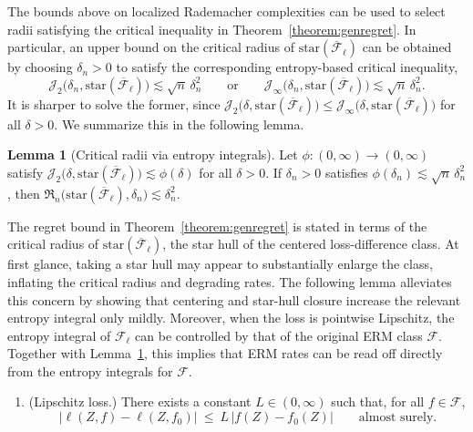 \documentclass[11pt]{article}
\theoremstyle{plain}
\theoremstyle{definition} %
\newtheorem{lemma}{Lemma}
\begin{document}
The bounds above on localized Rademacher complexities can be used to select radii satisfying the critical inequality in Theorem~\ref{theorem:genregret}. In particular, an upper bound on the critical radius of \(\mathrm{star}(\overline{\mathcal{F}}_{\ell})\) can be obtained by choosing \(\delta_n>0\) to satisfy the corresponding entropy-based critical inequality,
\[
\mathcal{J}_2\bigl(\delta_n,\mathrm{star}(\overline{\mathcal{F}}_{\ell})\bigr) \lesssim \sqrt{n}\,\delta_n^2
\qquad\text{or}\qquad
\mathcal{J}_\infty\bigl(\delta_n,\mathrm{star}(\overline{\mathcal{F}}_{\ell})\bigr) \lesssim \sqrt{n}\,\delta_n^2.
\]
It is sharper to solve the former, since \(\mathcal{J}_2\bigl(\delta,\mathrm{star}(\overline{\mathcal{F}}_{\ell})\bigr)\le \mathcal{J}_\infty\bigl(\delta,\mathrm{star}(\overline{\mathcal{F}}_{\ell})\bigr)\) for all \(\delta>0\). We summarize this in the following lemma.


\begin{lemma}[Critical radii via entropy integrals]
\label{lemma::critentropy}
Let \(\phi:(0,\infty)\to(0,\infty)\) satisfy
\(\mathcal{J}_2\bigl(\delta,\mathrm{star}(\overline{\mathcal{F}}_{\ell})\bigr)\lesssim \phi(\delta)\) for all \(\delta>0\).
If \(\delta_n>0\) satisfies \(\phi(\delta_n)\lesssim \sqrt{n}\,\delta_n^2\), then
\(\mathfrak{R}_n\bigl(\mathrm{star}(\overline{\mathcal{F}}_{\ell}),\delta_n\bigr)\lesssim \delta_n^2\).
\end{lemma}
 


The regret bound in Theorem~\ref{theorem:genregret} is stated in terms of the critical radius of
\(\mathrm{star}(\overline{\mathcal{F}}_{\ell})\), the star hull of the centered loss-difference class.
At first glance, taking a star hull may appear to substantially enlarge the class, inflating the critical radius and degrading rates.
The following lemma alleviates this concern by showing that centering and star-hull closure increase the relevant entropy integral only mildly.
Moreover, when the loss is pointwise Lipschitz, the entropy integral of \(\mathcal{F}_{\ell}\) can be controlled by that of the original ERM class \(\mathcal{F}\).
Together with Lemma~\ref{lemma::critentropy}, this implies that ERM rates can be read off directly from the entropy integrals for \(\mathcal{F}\).

\begin{enumerate}[label=\bfseries A\arabic*), ref={A\arabic*}, resume=main]
  \item \label{cond::lipschitz} (Lipschitz loss.)
  There exists a constant \(L\in(0,\infty)\) such that, for all \(f\in\mathcal F\),
  \[
  \bigl|\ell(Z,f)-\ell(Z,f_0)\bigr|
  \ \le\ 
  L\,\bigl|f(Z)-f_0(Z)\bigr|
  \qquad\text{almost surely.}
  \]
\end{enumerate}
\end{document}
